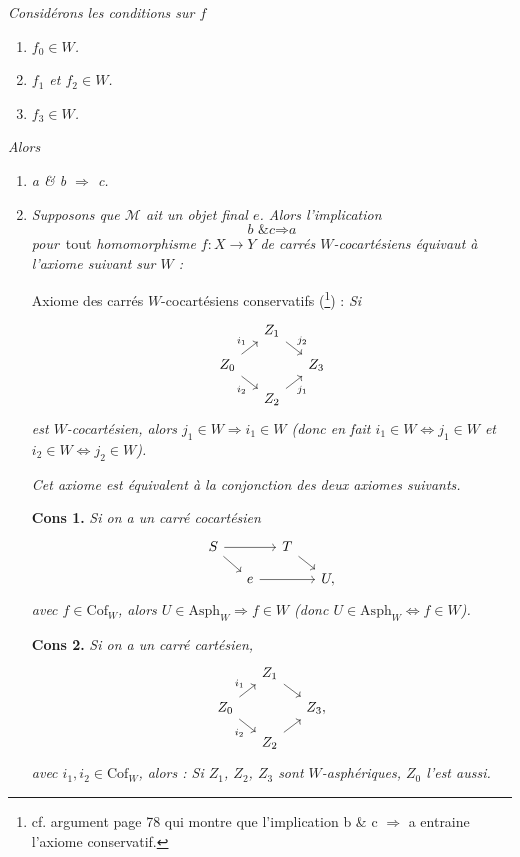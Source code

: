 \documentclass[11pt]{article}
\newcommand{\printedpage}[1]{\marginpar{\footnotesize p.~#1}}
\newcommand{\msp}[1]{\marginpar{\footnotesize [#1]}}
\newcommand{\Cof}{\mathrm{Cof}}
\newcommand{\Asph}{\mathrm{Asph}}
\begin{document}
\textit{Considérons les conditions sur $f$}

\begin{enumerate}
\item[\textit{a)}] \textit{$f_0 \in W$.}
\item[\textit{b)}] \textit{$f_1$ et $f_2 \in W$.}
\item[\textit{c)}] \textit{$f_3 \in W$.}
\end{enumerate}

\textit{Alors}

\begin{enumerate}
\item[\textit{1°)}] \textit{a \& b $\Longrightarrow$ c.}

\msp{page 273}

\item[\textit{2°)}] \textit{Supposons que $\mathcal{M}$ ait un objet final $e$. Alors l'implication}
\[
\textit{b \& c} \Longrightarrow \textit{a}
\]
\textit{pour}~tout \textit{homomorphisme $f : X \longrightarrow Y$ de carrés $W$-cocartésiens équivaut à l'axiome suivant sur $W$ :}

Axiome des carrés $W$-cocartésiens conservatifs (\footnote{cf. argument page 78 qui montre que l'implication b \& c $\Longrightarrow$ a entraine l'axiome conservatif.}) : \textit{Si}
\[
\begin{tikzcd}[column sep=small, row sep=small]
 & Z_1 \arrow[dr, "j_2"] & \\
Z_0 \arrow[ur, "i_1"] \arrow[dr, "i_2"'] & & Z_3 \\
 & Z_2 \arrow[ur, "j_1"'] &
\end{tikzcd}
\]
\textit{est $W$-cocartésien, alors $j_1 \in W \Longrightarrow i_1 \in W$ (donc en fait $i_1 \in W \Longleftrightarrow j_1 \in W$ et $i_2 \in W \Longleftrightarrow j_2 \in W$).}

\textit{Cet axiome est équivalent à la conjonction des deux axiomes suivants.}

\textbf{Cons 1.} \textit{Si on a un carré cocartésien}
\printedpage{178}
\[
\begin{tikzcd}[column sep=small, row sep=small]
S \arrow[rr] \arrow[dr] & & T \arrow[dr] & \\
 & e \arrow[rr] & & U,
\end{tikzcd}
\]
\textit{avec $f \in \Cof_W$, alors $U \in \Asph_W \Longrightarrow f \in W$ (donc $U \in \Asph_W \Longleftrightarrow f \in W$).}

\textbf{Cons 2.} \textit{Si on a un carré cartésien,}
\[
\begin{tikzcd}[column sep=small, row sep=small]
 & Z_1 \arrow[dr] & \\
Z_0 \arrow[ur, "i_1"] \arrow[dr, "i_2"'] & & Z_3, \\
 & Z_2 \arrow[ur] &
\end{tikzcd}
\]
\textit{avec $i_1, i_2 \in \Cof_W$, alors : Si $Z_1$, $Z_2$, $Z_3$ sont $W$-asphériques, $Z_0$ l'est aussi.}


\end{enumerate}
\end{document}
